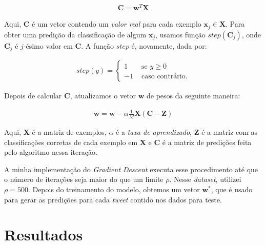 \documentclass[a4paper, 12pt]{article}
\begin{document}
\begin{align*}
    \boldsymbol{C} = \boldsymbol{w}^{T}\boldsymbol{X}
\end{align*}

Aqui, $\boldsymbol{C}$ é um vetor contendo um \textit{valor real} para
cada exemplo $\boldsymbol{x}_j \in \boldsymbol{X}$. Para obter uma predição
da classificação de algum $\boldsymbol{x}_j$, usamos função $step(\boldsymbol{C}_j)$,
onde $\boldsymbol{C}_j$ é $j$-ésimo valor em $\boldsymbol{C}$. A função $step$
é, novamente, dada por:

\begin{align*}
    step(y) = \begin{cases}
        1 & \text{ se } y \geq 0 \\
        -1 & \text{ caso contrário.}
    \end{cases}
\end{align*}

Depois de calcular $\boldsymbol{C}$,  atualizamos o vetor $\boldsymbol{w}$
de pesos da seguinte maneira:

\begin{align*}
    \boldsymbol{w} = \boldsymbol{w} - \alpha \frac{1}{M} \boldsymbol{X}(\boldsymbol{C} - \boldsymbol{Z})
\end{align*}

Aqui, $\boldsymbol{X}$ é a matriz de exemplos, $\alpha$ é a \textit{taxa de
aprendizado}, $\boldsymbol{Z}$ é a matriz com as classificações corretas de
cada exemplo em $\boldsymbol{X}$ e $\boldsymbol{C}$ é a matriz de predições
feita pelo algoritmo nessa iteração.

A minha implementação do \textit{Gradient Descent} executa esse procedimento
até que o número de iterações seja maior do que um limite $\rho$. Nesse
\textit{dataset}, utilizei $\rho = 500$. Depois do treinamento do modelo,
obtemos um vetor $\boldsymbol{w}^{*}$, que é usado para gerar as predições para cada
\textit{tweet} contido nos dados para teste.

\section{Resultados}
\end{document}
